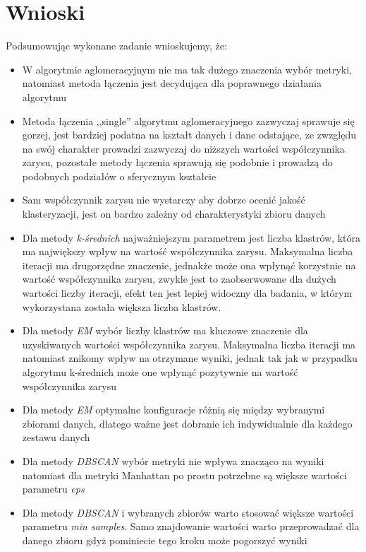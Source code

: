 \documentclass{classrep}
\begin{document}
    \section{Wnioski}
    \label{conclusions} {
        Podsumowując wykonane zadanie wnioskujemy, że:
        \begin{itemize}
            \item W algorytmie aglomeracyjnym nie ma tak dużego znaczenia wybór
            metryki, natomiast metoda łączenia jest decydująca dla poprawnego
            działania algorytmu
            \item Metoda łączenia ,,single'' algorytmu aglomeracyjnego zazwyczaj
            sprawuje się gorzej, jest bardziej podatna na kształt danych i dane
            odstające, ze zwzględu na swój charakter prowadzi zazwyczaj do
            niższych wartości współczynnika zarysu, pozostałe metody łączenia
            sprawują się podobnie i prowadzą do podobnych podziałów o sferycznym
            kształcie
            \item Sam współczynnik zarysu nie wystarczy aby dobrze ocenić jakość
            klasteryzacji, jest on bardzo zależny od charakterystyki zbioru danych
            \item Dla metody \textit{k-średnich} najważniejszym parametrem jest liczba klastrów, która ma największy wpływ na wartość współczynnika zarysu. Maksymalna liczba iteracji ma drugorzędne znaczenie, jednakże może ona wpłynąć korzystnie na wartość współczynnika zarysu, zwykle jest to zaobserwowane dla dużych wartości liczby iteracji, efekt ten jest lepiej widoczny dla badania, w którym wykorzystana została większa liczba klastrów.
            \item Dla metody \textit{EM} wybór liczby klastrów ma kluczowe znaczenie dla uzyskiwanych wartości współczynnika zarysu. Maksymalna liczba iteracji ma natomiast znikomy wpływ na otrzymane wyniki, jednak tak jak w przypadku algorytmu k-średnich może one wpłynąć pozytywnie na wartość współczynnika zarysu
            \item Dla metody \textit{EM} optymalne konfiguracje różnią się między wybranymi zbiorami danych, dlatego ważne jest dobranie ich indywidualnie dla każdego zestawu danych
            \item Dla metody \textit{DBSCAN} wybór metryki nie wpływa znacząco na
            wyniki natomiast dla metryki Manhattan po prostu potrzebne są większe wartości
            parametru \textit{eps}
            \item Dla metody \textit{DBSCAN} i wybranych zbiorów warto stosować większe
            wartości parametru \textit{min samples}. Samo znajdowanie wartości warto
            przeprowadzać dla danego zbioru gdyż pominiecie tego kroku może pogorszyć
            wyniki

        \end{itemize}
    }
\end{document}
